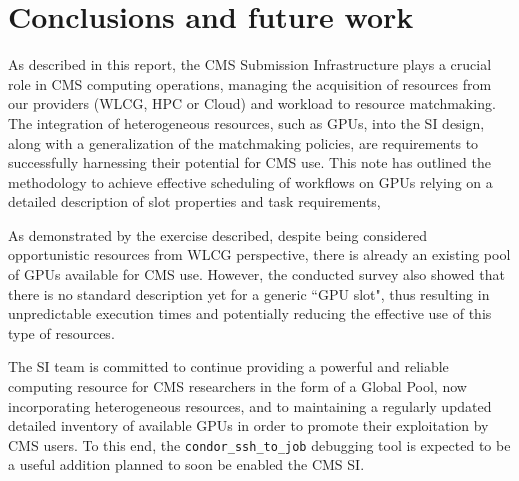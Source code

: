\documentclass[a4paper]{jpconf}
\begin{document}


\section{Conclusions and future work}\label{sec:conclusions}
As described in this report, the CMS Submission Infrastructure plays a crucial role in CMS computing operations, managing the acquisition of resources from our providers (WLCG, HPC or Cloud) and workload to resource matchmaking. The integration of heterogeneous resources, such as GPUs, into the SI design, along with a generalization of the matchmaking policies, are requirements to successfully harnessing their potential for CMS use. This note has outlined the methodology to achieve effective scheduling of workflows on GPUs relying on a detailed description of slot properties and task requirements, 

As demonstrated by the exercise described, despite being considered opportunistic resources from WLCG perspective, there is already an existing pool of GPUs available for CMS use. However, the conducted survey also showed that there is no standard description yet for a generic ``GPU slot", thus resulting in unpredictable execution times and potentially reducing the effective use of this type of resources.

The SI team is committed to continue providing a powerful and reliable computing resource for CMS researchers in the form of a Global Pool, now incorporating heterogeneous resources, and to maintaining a regularly updated detailed inventory of available GPUs in order to promote their exploitation by CMS users. To this end, the \verb|condor_ssh_to_job| debugging tool is expected to be a useful addition planned to soon be enabled the CMS SI.
\end{document}
